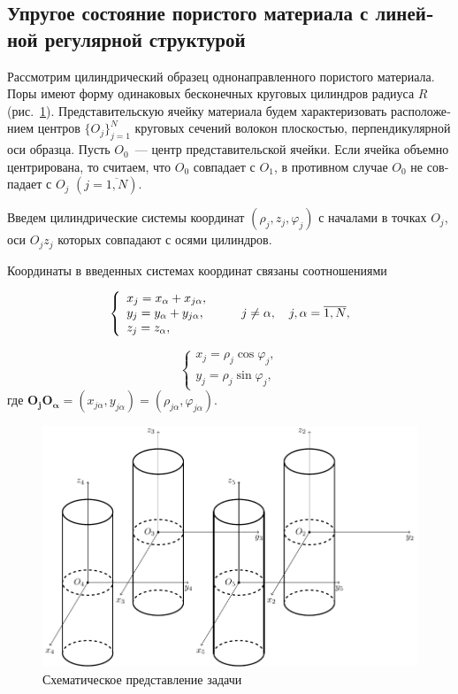 \begin{russian}
\section{Упругое состояние пористого материала с линейной регулярной структурой}

Рассмотрим цилиндрический образец однонаправленного пористого материала. Поры имеют форму одинаковых бесконечных круговых цилиндров радиуса $R$ (рис.~\ref{fig:cyl-4a}). Представительскую ячейку материала будем характеризовать расположением центров $\{O_j\}_{j=1}^N$ круговых сечений волокон плоскостью, перпендикулярной оси образца. Пусть $O_0$~--- центр представительской ячейки. Если ячейка объемно центрирована, то считаем, что $O_0$ совпадает с $O_1$, в противном случае $O_0$ не совпадает с $O_j$ $(j=\overline{1,N})$.

Введем цилиндрические системы координат $\left( {{\rho _j},{z_j},{\varphi _j}} \right)$ с началами в точках $O_j$, оси $O_jz_j$ которых совпадают с осями цилиндров.

Координаты в введенных системах координат связаны соотношениями

\begin{equation}
\left\{ {\begin{array}{*{20}{l}}
{{x_j} = {x_\alpha } + {x_{j\alpha }},}\\
{{y_j} = {y_\alpha } + {y_{j\alpha }},}\\
{{z_j} = {z_\alpha },}
\end{array}} \right.\qquad {\kern 1pt} j \ne \alpha ,\quad j,\alpha  = \overline {1,N},
\label{eq:7:25}
\end{equation}

\begin{equation}
\left\{ \begin{array}{l}
{x_j} = {\rho _j}\cos {\varphi _j},\\
{y_j} = {\rho _j}\sin {\varphi _j},
\end{array} \right.
\label{eq:7:26}
\end{equation}
где $\mathbf{O_jO_\alpha}=(x_{j\alpha},y_{j\alpha})=(\rho_{j\alpha},\varphi_{j\alpha})$.
 
\begin{figure}
\centering\includegraphics[width=12cm]{cylinders-4.pdf}
\caption{Схематическое представление задачи}
\label{fig:cyl-4a}
\end{figure}


\end{russian}
